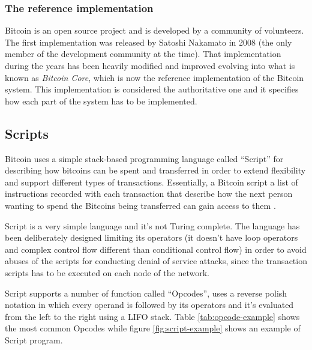 \subsubsection*{The reference implementation}
Bitcoin is an open source project and is developed by a community of volunteers.
The first implementation was released by Satoshi Nakamato in 2008 (the only member
of the development community at the time). That implementation during the years
has been heavily modified and improved evolving into what is known as \emph{Bitcoin
Core}, which is now the reference implementation of the Bitcoin system. This
implementation is considered the authoritative one and it specifies how each
part of the system has to be implemented.










\subsection{Scripts} Bitcoin uses a simple stack-based programming language
called ``Script'' for describing how bitcoins can be spent and transferred in
order to extend flexibility and support different types of transactions.
Essentially, a Bitcoin script a list of instructions recorded with each
transaction that describe how the next person wanting to spend the Bitcoins
being transferred can gain access to them \cite{script-bitcoin-wiki}.

Script is a very simple language and it's not Turing complete. The language has
been deliberately designed limiting its operators (it doesn't have loop operators
and complex control flow different than conditional control flow) in order to
avoid abuses of the scripts for conducting denial of service attacks, since the
transaction scripts has to be executed on each node of the network.

Script supports a number of function called ``Opcodes'', uses a reverse polish
notation in which every operand is followed by its operators and it's evaluated
from the left to the right using a LIFO stack. Table \ref{tab:opcode-example} shows the most common
Opcodes while figure \ref{fig:script-example} shows an example of Script program.



